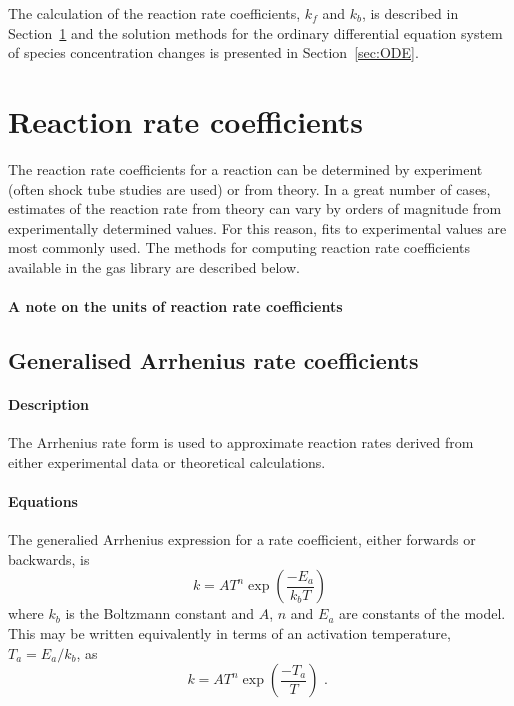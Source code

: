 The calculation of the reaction rate coefficients, $k_f$ and $k_b$, is described in
Section~\ref{sec:reac_coeffs} and the solution methods for the ordinary differential
equation system of species concentration changes is presented in Section~\ref{sec:ODE}.

\section{Reaction rate coefficients}
\label{sec:reac_coeffs}

The reaction rate coefficients for a reaction can be determined by experiment (often
shock tube studies are used) or from theory.
In a great number of cases, estimates of the reaction rate from theory can vary by
orders of magnitude from experimentally determined values.
For this reason, fits to experimental values are most commonly used.
The methods for computing reaction rate coefficients available in the
gas library are described below.

\paragraph{A note on the units of reaction rate coefficients}



\subsection{Generalised Arrhenius rate coefficients}
\paragraph{Description}
The Arrhenius rate form is used to approximate reaction
rates derived from either experimental data
or theoretical calculations.

\paragraph{Equations}

The generalied Arrhenius expression for a rate coefficient, either forwards or backwards, is
\begin{equation}
\label{eqn:ga}
k = A T^{n} \exp{\left( \frac{-E_a}{k_bT}\right)}
\end{equation}
where $k_b$ is the Boltzmann constant and $A$, $n$ and $E_a$ are constants
of the model.
This may be written equivalently in terms of an activation
temperature, $T_a = E_a/k_b$, as
\begin{equation}
k = A T^{n} \exp{\left( \frac{-T_a}{T}\right)} \text{ . }
\end{equation}


